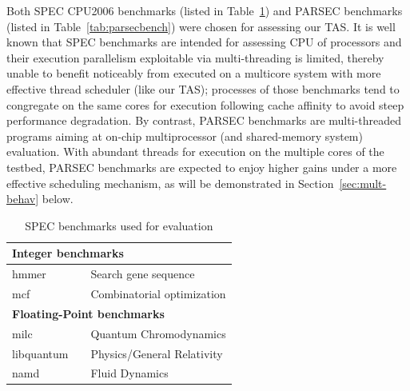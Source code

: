 \documentclass[times, 10pt,twocolumn]{IEEEtran}
\begin{document}
Both SPEC CPU2006 benchmarks (listed in Table~\ref{tab:benchmarks}) and
PARSEC benchmarks (listed in Table~\ref{tab:parsecbench}) were chosen
for assessing our TAS.  It is well known that SPEC benchmarks are
intended for assessing CPU of processors and their execution parallelism
exploitable via multi-threading is limited, thereby unable to benefit
noticeably from executed on a multicore system with more effective
thread scheduler (like our TAS); processes of those benchmarks
tend to congregate on the same cores for execution following cache affinity
to avoid steep performance degradation.
By contrast, PARSEC benchmarks are multi-threaded
programs aiming at on-chip multiprocessor (and shared-memory system)
evaluation.  With abundant threads for execution on the multiple cores
of the testbed, PARSEC benchmarks are expected to enjoy higher gains under
a more effective scheduling mechanism, as will be demonstrated in
Section~\ref{sec:mult-behav} below.

\begin{small}
\begin{table}[tbph]
\caption{SPEC benchmarks used for evaluation}
\label{tab:benchmarks} 
\centering
\begin{tabular}{l c p{5cm}} 
\hline 
\hline
\multicolumn{3}{l}{\textbf{Integer benchmarks}}\\
\hline 
hmmer &  & Search gene sequence \\
mcf &  & Combinatorial optimization \\
\hline 
\hline
\multicolumn{3}{l}{\textbf{Floating-Point benchmarks}}\\ 
\hline 
milc &  & Quantum Chromodynamics \\
libquantum &  & Physics/General Relativity \\
namd &  & Fluid Dynamics \\
\hline
\end{tabular} %
\end{table}
\end{small}

\end{document}
